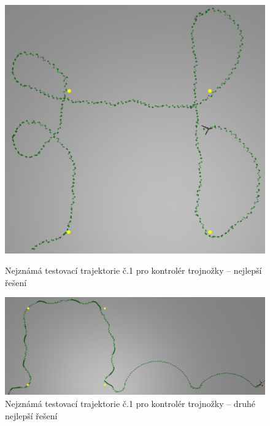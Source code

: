 \begin{figure}[h]
    \begin{minipage}[c]{0.48\linewidth}
        \includegraphics[width=\linewidth]{obrazky/trojnozka_testovaci_trajektorie1_nejlepsi_reseni.png}
        \caption{Nejznámá testovací trajektorie č.1 pro kontrolér trojnožky -- nejlepší řešení}
        \label{fig:trojnozka_testovaci_trajektorie1_nejlepsi_reseni}
    \end{minipage}
    \hfill
    \begin{minipage}[c]{0.48\linewidth}
        \includegraphics[width=\linewidth]{obrazky/trojnozka_testovaci_trajektorie1_druhe_reseni.png}
        \caption{Nejznámá testovací trajektorie č.1 pro kontrolér trojnožky -- druhé nejlepší řešení}
        \label{fig:trojnozka_testovaci_trajektorie1_druhe_reseni}
    \end{minipage}
\end{figure}

